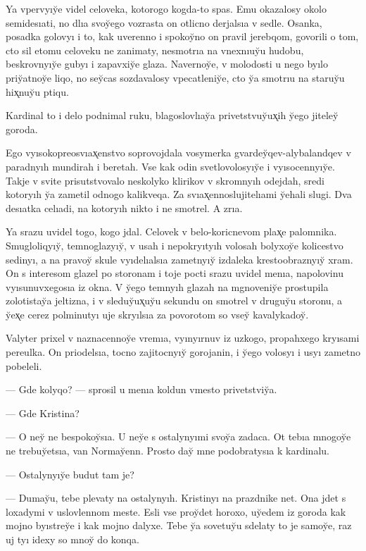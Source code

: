 \documentclass[10pt]{book}
\begin{document}
Ya vpervyıy̆e videl celoveka, kotorogo kogda-to spas. Emu okazalosy okolo semidesıati, no dlıa svoy̆ego vozrasta on otlicno derjalsıa v sedle. Osanka, posadka golovyı i to, kak uverenno i spokoy̆no on pravil jerebqom, govorili o tom, cto sil etomu celoveku ne zanimaty, nesmotrıa na vnexnıuy̆u hudobu, beskrovnyıy̆e gubyı i zapavxiy̆e glaza. Navernoy̆e, v molodosti u nego byılo priy̆atnoy̆e liqo, no sey̆cas sozdavalosy vpecatleniy̆e, cto y̆a smotrıu na staruy̆u hix̨nuy̆u ptiqu.

Kardinal to i delo podnimal ruku, blagoslovlıay̆a privetstvuy̆ux̨ih y̆ego jiteley̆ goroda.

Ego vyısokopreosvıax̨enstvo soprovojdala vosymerka gvardey̆qev-alybalandqev v paradnyıh mundirah i beretah. Vse kak odin svetlovolosyıy̆e i vyısocennyıy̆e. Takje v svite prisutstvovalo neskolyko klirikov v skromnyıh odejdah, sredi kotoryıh y̆a zametil odnogo kalikveqa. Za svıax̨ennoslujitelıami y̆ehali slugi. Dva desıatka celıadi, na kotoryıh nikto i ne smotrel. A zrıa.

Ya srazu uvidel togo, kogo jdal. Celovek v belo-koricnevom plax̨e palomnika. Smugloliqyıy̆, temnoglazyıy̆, v usah i nepokryıtyıh volosah bolyxoy̆e kolicestvo sedinyı, a na pravoy̆ skule vyıdelıalsıa zametnyıy̆ izdaleka krestoobraznyıy̆ xram. On s interesom glazel po storonam i toje pocti srazu uvidel menıa, napolovinu vyısunuvxegosıa iz okna. V y̆ego temnyıh glazah na mgnoveniy̆e prostupila zolotistay̆a jeltizna, i v sleduy̆ux̨uy̆u sekundu on smotrel v druguy̆u storonu, a y̆ex̨e cerez polminutyı uje skryılsıa za povorotom so vsey̆ kavalykadoy̆.



Valyter prixel v naznacennoy̆e vremıa, vyınyırnuv iz uzkogo, propahxego kryısami pereulka. On priodelsıa, tocno zajitocnyıy̆ gorojanin, i y̆ego volosyı i usyı zametno pobeleli.

— Gde kolyqo? — sprosil u menıa koldun vmesto privetstviy̆a.

— Gde Kristina?

— O ney̆ ne bespokoy̆sıa. U ney̆e s ostalynyımi svoy̆a zadaca. Ot tebıa mnogoy̆e ne trebuy̆etsıa, van Normay̆enn. Prosto day̆ mne podobratysıa k kardinalu.

— Ostalynyıy̆e budut tam je?

— Dumay̆u, tebe plevaty na ostalynyıh. Kristinyı na prazdnike net. Ona jdet s loxadymi v uslovlennom meste. Esli vse proy̆det horoxo, uy̆edem iz goroda kak mojno byıstrey̆e i kak mojno dalyxe. Tebe y̆a sovetuy̆u sdelaty to je samoy̆e, raz uj tyı idexy so mnoy̆ do konqa.
\end{document}
